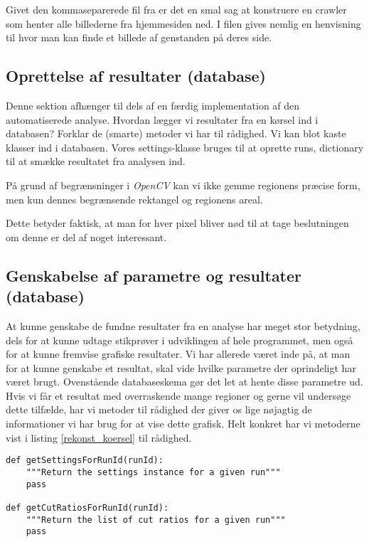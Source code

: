 {Givet den kommaseparerede fil fra \cite{wgahu} er det en smal sag at
konstruere en crawler som henter alle billederne fra hjemmesiden ned. I
filen gives nemlig en henvisning til hvor man kan finde et billede af
genstanden på deres side.

\subsection{Oprettelse af resultater (database)}
Denne sektion afhænger til dels af en færdig implementation af den
automatiserede analyse. Hvordan lægger vi resultater fra en kørsel ind i
databasen? Forklar de (smarte) metoder vi har til rådighed. Vi kan blot
kaste klasser ind i databasen. Vores settings-klasse bruges til at
oprette runs, dictionary til at smække resultatet fra analysen ind.

På grund af begrænsninger i \emph{OpenCV} kan vi ikke gemme regionens
præcise form, men kun dennes begrænsende rektangel og regionens areal.

Dette betyder faktisk, at man for hver pixel bliver nød
til at tage beslutningen om denne er del af noget interessant.

\subsection{Genskabelse af parametre og resultater (database)}
At kunne genskabe de fundne resultater fra en analyse har meget stor
betydning, dels for at kunne udtage stikprøver i udviklingen af hele
programmet, men også for at kunne fremvise grafiske resultater. Vi har
allerede været inde på, at man for at kunne genskabe et resultat, skal
vide hvilke parametre der oprindeligt har været brugt. Ovenstående
databaseskema gør det let at hente disse parametre ud. Hvis vi får et
resultat med overraskende mange regioner og gerne vil undersøge dette
tilfælde, har vi metoder til rådighed der giver os lige nøjagtig de
informationer vi har brug for at vise dette grafisk. Helt konkret har vi
metoderne vist i listing \ref{rekonst_koersel} til rådighed.

\vspace{0.5cm}
\begin{lstlisting}[caption={Metoder til rekonstruktion af kørsler},captionpos=b,label={rekonst_koersel},numbers=none]
def getSettingsForRunId(runId):
    """Return the settings instance for a given run"""
    pass

def getCutRatiosForRunId(runId):
    """Return the list of cut ratios for a given run"""
    pass


\end{lstlisting}}
